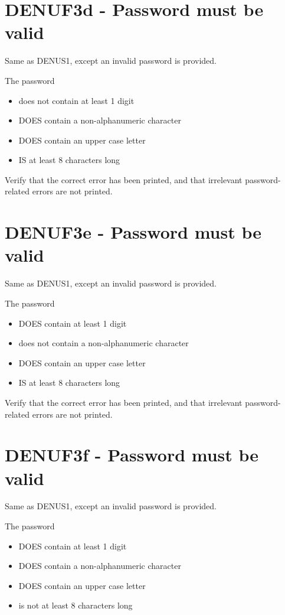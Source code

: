 \documentclass{article}
\begin{document}
\section*{DENUF3d - Password must be valid}

Same as DENUS1, except an invalid password is provided.

The password
\begin{itemize}
  \item does not contain at least 1 digit
  \item DOES contain a non-alphanumeric character
  \item DOES contain an upper case letter
  \item IS at least 8 characters long
\end{itemize}

Verify that the correct error has been printed, and that
irrelevant password-related errors are not printed.

\section*{DENUF3e - Password must be valid}

Same as DENUS1, except an invalid password is provided.

The password
\begin{itemize}
  \item DOES contain at least 1 digit
  \item does not contain a non-alphanumeric character
  \item DOES contain an upper case letter
  \item IS at least 8 characters long
\end{itemize}

Verify that the correct error has been printed, and that
irrelevant password-related errors are not printed.

\section*{DENUF3f - Password must be valid}

Same as DENUS1, except an invalid password is provided.

The password
\begin{itemize}
  \item DOES contain at least 1 digit
  \item DOES contain a non-alphanumeric character
  \item DOES contain an upper case letter
  \item is not at least 8 characters long
\end{itemize}
\end{document}

